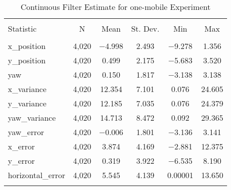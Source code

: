 
\begin{table}[h] \centering 
  \caption{Continuous Filter Estimate for one-mobile Experiment} 
  \label{tab:one_mobile_continuous_summary} 
\begin{tabular}{@{\extracolsep{5pt}}lccccc} 
\\[-1.8ex]\hline 
\hline \\[-1.8ex] 
Statistic & \multicolumn{1}{c}{N} & \multicolumn{1}{c}{Mean} & \multicolumn{1}{c}{St. Dev.} & \multicolumn{1}{c}{Min} & \multicolumn{1}{c}{Max} \\ 
\hline \\[-1.8ex] 
x\_position & 4,020 & $-$4.998 & 2.493 & $-$9.278 & 1.356 \\ 
y\_position & 4,020 & 0.499 & 2.175 & $-$5.683 & 3.520 \\ 
yaw & 4,020 & 0.150 & 1.817 & $-$3.138 & 3.138 \\ 
x\_variance & 4,020 & 12.354 & 7.101 & 0.076 & 24.605 \\ 
y\_variance & 4,020 & 12.185 & 7.035 & 0.076 & 24.379 \\ 
yaw\_variance & 4,020 & 14.713 & 8.472 & 0.092 & 29.365 \\ 
yaw\_error & 4,020 & $-$0.006 & 1.801 & $-$3.136 & 3.141 \\ 
x\_error & 4,020 & 3.874 & 4.169 & $-$2.881 & 12.375 \\ 
y\_error & 4,020 & 0.319 & 3.922 & $-$6.535 & 8.190 \\ 
horizontal\_error & 4,020 & 5.545 & 4.139 & 0.00001 & 13.650 \\ 
\hline \\[-1.8ex] 
\end{tabular} 
\end{table} 
